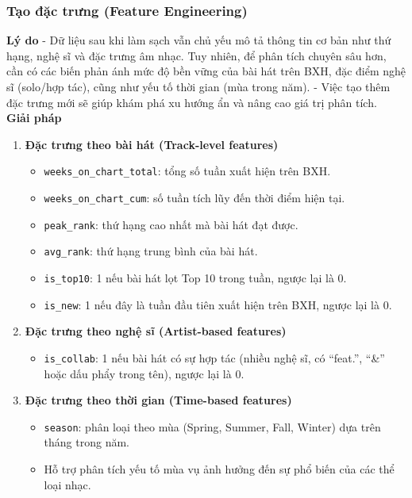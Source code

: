 \subsubsection{Tạo đặc trưng (Feature Engineering)}

\textbf{Lý do} 
- Dữ liệu sau khi làm sạch vẫn chủ yếu mô tả thông tin cơ bản như thứ hạng, nghệ sĩ và đặc trưng âm nhạc. 
Tuy nhiên, để phân tích chuyên sâu hơn, cần có các biến phản ánh mức độ bền vững của bài hát trên BXH, 
đặc điểm nghệ sĩ (solo/hợp tác), cũng như yếu tố thời gian (mùa trong năm). 
- Việc tạo thêm đặc trưng mới sẽ giúp khám phá xu hướng ẩn và nâng cao giá trị phân tích. \\

\textbf{Giải pháp} 
\begin{enumerate}[label=\arabic*]
    \item \textbf{Đặc trưng theo bài hát (Track-level features)}
    \begin{itemize}
        \item \texttt{weeks\_on\_chart\_total}: tổng số tuần xuất hiện trên BXH.
        \item \texttt{weeks\_on\_chart\_cum}: số tuần tích lũy đến thời điểm hiện tại.
        \item \texttt{peak\_rank}: thứ hạng cao nhất mà bài hát đạt được.
        \item \texttt{avg\_rank}: thứ hạng trung bình của bài hát.
        \item \texttt{is\_top10}: 1 nếu bài hát lọt Top 10 trong tuần, ngược lại là 0.
        \item \texttt{is\_new}: 1 nếu đây là tuần đầu tiên xuất hiện trên BXH, ngược lại là 0.
    \end{itemize}

    \item \textbf{Đặc trưng theo nghệ sĩ (Artist-based features)}
    \begin{itemize}
        \item \texttt{is\_collab}: 1 nếu bài hát có sự hợp tác (nhiều nghệ sĩ, có “feat.”, “\&” hoặc dấu phẩy trong tên), 
        ngược lại là 0.
    \end{itemize}

    \item \textbf{Đặc trưng theo thời gian (Time-based features)}
    \begin{itemize}
        \item \texttt{season}: phân loại theo mùa (Spring, Summer, Fall, Winter) dựa trên tháng trong năm.
        \item Hỗ trợ phân tích yếu tố mùa vụ ảnh hưởng đến sự phổ biến của các thể loại nhạc.
    \end{itemize}
\end{enumerate}


